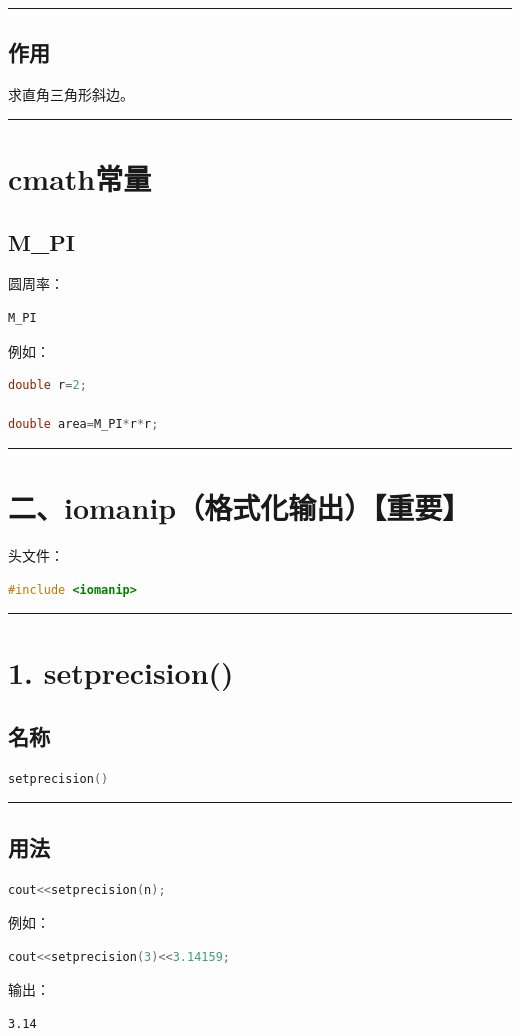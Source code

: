 \documentclass[10pt,twocolumn]{extarticle}
\begin{document}
\noindent\rule{\linewidth}{0.4pt}

\subsection{作用}
求直角三角形斜边。

\noindent\rule{\linewidth}{0.4pt}

\section{cmath常量}

\subsection{M\_PI}
圆周率：
\begin{lstlisting}[language=C++]
M_PI
\end{lstlisting}
例如：
\begin{lstlisting}[language=C++]
double r=2;

double area=M_PI*r*r;
\end{lstlisting}

\noindent\rule{\linewidth}{0.4pt}

\section{二、iomanip（格式化输出）\textbf{【重要】}}

头文件：
\begin{lstlisting}[language=C++]
#include <iomanip>
\end{lstlisting}

\noindent\rule{\linewidth}{0.4pt}

\section{1. setprecision()}

\subsection{名称}
\begin{lstlisting}[language=C++]
setprecision()
\end{lstlisting}

\noindent\rule{\linewidth}{0.4pt}

\subsection{用法}
\begin{lstlisting}[language=C++]
cout<<setprecision(n);
\end{lstlisting}
例如：
\begin{lstlisting}[language=C++]
cout<<setprecision(3)<<3.14159;
\end{lstlisting}
输出：
\begin{lstlisting}
3.14
\end{lstlisting}
\end{document}
